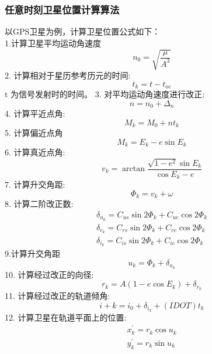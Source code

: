 \documentclass{ctexart}
\begin{document}
\subsubsection{任意时刻卫星位置计算算法}
\label{2.6.1}
以GPS卫星为例，计算卫星位置公式如下：\\
1.计算卫星平均运动角速度
\begin{equation}
n_{0}=\sqrt{\frac{\mu}{A^3}}
\end{equation}
2. 计算相对于星历参考历元的时间:
\begin{equation}
t_{k}=t-t_{o e}
\end{equation}
t 为信号发射时的时间。
3. 对平均运动角速度进行改正:
\begin{equation}
n=n_{0}+\Delta_{n}
\end{equation}
4. 计算平近点角:
\begin{equation}
M_{k}=M_{0}+n t_{k}
\end{equation}
5. 计算偏近点角
\begin{equation}
M_{k}=E_{k}-e \sin E_{k}
\end{equation}
6. 计算真近点角:
\begin{equation}
v_{k}=\arctan \frac{\sqrt{1-e^{2}} \sin E_{k}}{ \cos E_{k}-e}
\end{equation}
7. 计算升交角距:
\begin{equation}
\Phi_{k}=v_{k}+\omega
\end{equation}
8. 计算二阶改正数:
\begin{equation}
\begin{gathered}
\delta_{u_{k}}=C_{u s} \sin 2 \Phi_{k}+C_{u c} \cos 2 \Phi_{k} \\
\delta_{r_{k}}=C_{r s} \sin 2 \Phi_{k}+C_{r c} \cos 2 \Phi_{k} \\
\delta_{i_{k}}=C_{i s} \sin 2 \Phi_{k}+C_{i c} \cos 2 \Phi_{k}
\end{gathered}
\end{equation}
9.计算升交角距
\begin{equation}
u_k=\Phi_{k}+\delta_{u_{k}}
\end{equation}
10. 计算经过改正的向径:
\begin{equation}
r_{k}=A\left(1-e \cos E_{k}\right)+\delta_{r_{k}}
\end{equation}
11. 计算经过改正的轨道倾角:
\begin{equation}
i+k=i_{0}+\delta_{i_{k}}+(I D O T) t_{k}
\end{equation}
12. 计算卫星在轨道平面上的位置:
\begin{equation}
\begin{gathered}
x_{k}^{\prime}=r_{k} \cos u_{k} \\
y_{k}^{\prime}=r_{k} \sin u_{k}
\end{gathered}
\end{equation}
\end{document}
